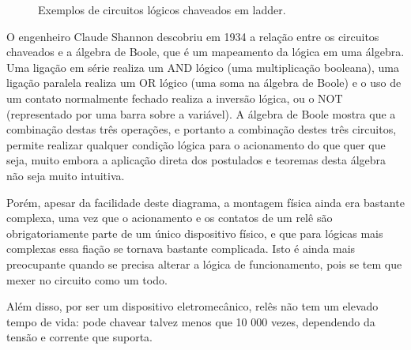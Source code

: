 \begin{figure}[!h]
  \caption{Exemplos de circuitos lógicos chaveados em ladder.}
  \label{fig:ladders}
\end{figure}


O engenheiro Claude Shannon descobriu em 1934 a relação entre os circuitos chaveados e a álgebra de Boole, que é um mapeamento da lógica em uma álgebra. Uma ligação em série realiza um $\mathrm{AND}$ lógico (uma multiplicação booleana), uma ligação paralela realiza um $\mathrm{OR}$ lógico (uma soma na álgebra de Boole) e o uso de um contato normalmente fechado realiza a inversão lógica, ou o $\mathrm{NOT}$ (representado por uma barra sobre a variável). A álgebra de Boole mostra que a combinação destas três operações, e portanto a combinação destes três circuitos, permite realizar qualquer condição lógica para o acionamento do que quer que seja, muito embora a aplicação direta dos postulados e teoremas desta álgebra não seja muito intuitiva.

Porém, apesar da facilidade deste diagrama, a montagem física ainda era bastante complexa, uma vez que o acionamento e os contatos de um relê são obrigatoriamente parte de um único dispositivo físico, e que para lógicas mais complexas essa fiação se tornava bastante complicada. Isto é ainda mais preocupante quando se precisa alterar a lógica de funcionamento, pois se tem que mexer no circuito como um todo.

Além disso, por ser um dispositivo eletromecânico, relês não tem um elevado tempo de vida: pode chavear talvez menos que 10 000 vezes, dependendo da tensão e corrente que suporta.

